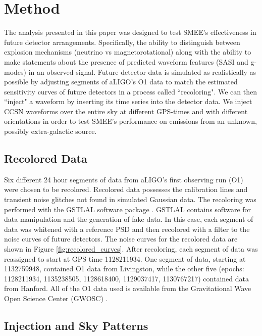 \documentclass[letterpaper, aps, prd, twocolumn, superscriptaddress, showpacs, nofootinbib]{revtex4}
\begin{document}
\section{Method}
\label{sec:method}

The analysis presented in this paper was designed to test SMEE's effectiveness in future detector arrangements. Specifically, the ability to distinguish between explosion mechanisms (neutrino vs magnetorotational) along with the ability to make statements about the presence of predicted waveform features (SASI and g-modes) in an observed signal. Future detector data is simulated as realistically as possible by adjusting segments of aLIGO's O1 data to match the estimated sensitivity curves of future detectors in a process called ``recoloring". We can then ``inject" a waveform by inserting its time series into the detector data. We inject CCSN waveforms over the entire sky at different GPS-times and with different orientations in order to test SMEE's performance on emissions from an unknown, possibly extra-galactic source.

\subsection{Recolored Data}

Six different 24 hour segments of data from aLIGO's first observing run (O1) were chosen to be recolored. Recolored data possesses the calibration lines and transient noise glitches not found in simulated Gaussian data. The recoloring was performed with the GSTLAL software package \cite{messick2017analysis}. GSTLAL contains software for data manipulation and the generation of fake data. In this case, each segment of data was whitened with a reference PSD and then recolored with a filter to the noise curves of future detectors. The noise curves for the recolored data are shown in Figure \ref{fig:recolored_curves}. After recoloring, each segment of data was reassigned to start at GPS time 1128211934. One segment of data, starting at 1132759948, contained O1 data from Livingston, while the other five (epochs: 1128211934, 1135238505, 1128618400, 1129037417, 1130767217) contained data from Hanford. All of the O1 data used is available from the Gravitational Wave Open Science Center (GWOSC) \cite{2015JPhCS.610a2021V}. 

\subsection{Injection and Sky Patterns}
\end{document}
